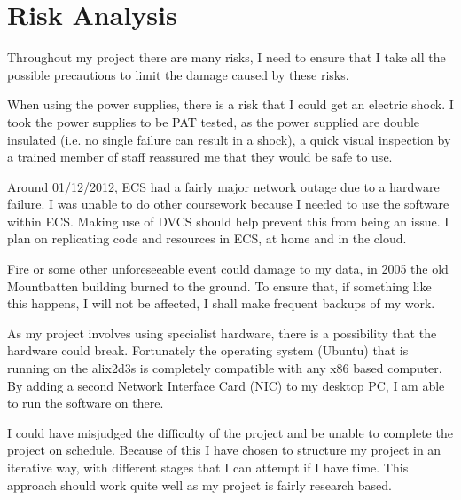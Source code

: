 \documentclass[12pt]{report}
\begin{document}
\section{Risk Analysis}
Throughout my project there are many risks, I need to ensure that I take all the
possible precautions to limit the damage caused by these risks.

When using the power supplies, there is a risk that I could get an electric
shock. I took the power supplies to be PAT tested, as the power supplied are
double insulated (i.e. no single failure can result in a shock), a quick visual
inspection by a trained member of staff reassured me that they would be safe to
use. 

Around 01/12/2012, ECS had a fairly major network outage due to a hardware
failure. I was unable to do other coursework because I needed to use the
software within ECS. Making use of DVCS should help prevent this from being an
issue. I plan on replicating code and resources in ECS, at home and in the
cloud. 

Fire or some other unforeseeable event could damage to my data, in 2005 the old
Mountbatten building burned to the ground. To ensure that, if something like
this happens, I will not be affected, I shall make frequent backups of my work.

As my project involves using specialist hardware, there is a possibility that
the hardware could break. Fortunately the operating system (Ubuntu) that is
running on the alix2d3s is completely compatible with any x86 based computer. By
adding a second Network Interface Card (NIC)  to my desktop PC, I am able to run the software on there. 

I could have misjudged the difficulty of the project and be unable to complete
the project on schedule.  Because of this I have chosen to structure my project
in an iterative way, with different stages that I can attempt if I have time.
This approach should work quite well as my project is fairly research based. 

\pagebreak
\end{document}
